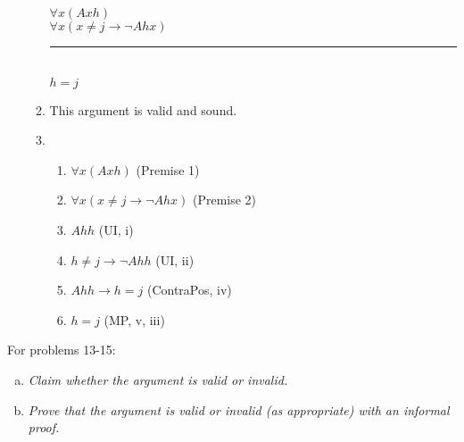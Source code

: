 \documentclass{article}
\begin{document}
\begin{enumerate}
\begin{enumerate}
                        $\forall x(Axh)$\\
                        $\forall x (x \neq j \to \neg Ahx)$\\
                        \rule{15em}{.5pt}\\
                        $h=j$
                  \item This argument is valid and sound.
                        \setcounter{enumii}{3}
                  \item \begin{enumerate}
                              \item $\forall x(Axh)$ (Premise 1)
                              \item $\forall x (x \neq j \to \neg Ahx)$ (Premise 2)
                              \item $Ahh$ (UI, i)
                              \item $h \neq j \to \neg Ahh$ (UI, ii)
                              \item $Ahh \to h = j$ (ContraPos, iv)
                              \item $h = j$ (MP, v, iii)
                        \end{enumerate}
            \end{enumerate}
\end{enumerate}

\begin{flushleft}
      For problems 13-15:
\end{flushleft}
\begin{enumerate}[(a)]
      \item \textit{Claim whether the argument is valid or invalid.}
      \item \textit{Prove that the argument is valid or invalid (as appropriate) with an informal proof.}
\end{enumerate}
\end{document}
